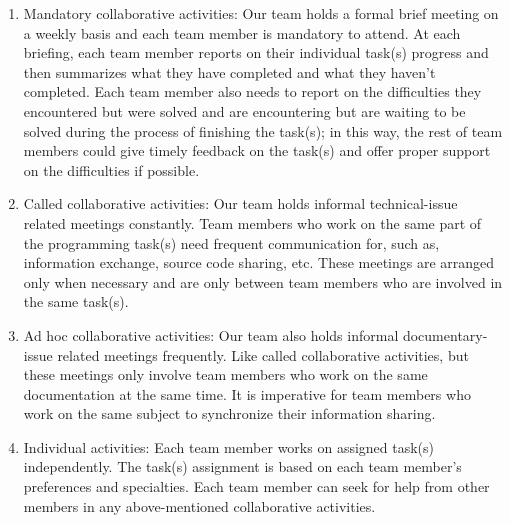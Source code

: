 \documentclass[12pt]{article}
\begin{document}
\begin{enumerate}
    \item Mandatory collaborative activities: \newline
    Our team holds a formal brief meeting on a weekly basis and each team member is mandatory to attend. At each briefing, each team member reports on their individual task(s) progress and then summarizes what they have completed and what they haven’t completed. \newline
    Each team member also needs to report on the difficulties they encountered but were solved and are encountering but are waiting to be solved during the process of finishing the task(s); in this way, the rest of team members could give timely feedback on the task(s) and offer proper support on the difficulties if possible.
    \item Called collaborative activities: \newline
    Our team holds informal technical-issue related meetings constantly. Team members who work on the same part of the programming task(s) need frequent communication for, such as, information exchange, source code sharing, etc. These meetings are arranged only when necessary and are only between team members who are involved in the same task(s).
    \item Ad hoc collaborative activities: \newline
    Our team also holds informal documentary-issue related meetings frequently. Like called collaborative activities, but these meetings only involve team members who work on the same documentation at the same time. It is imperative for team members who work on the same subject to synchronize their information sharing.
    \item Individual activities: \newline
    Each team member works on assigned task(s) independently. The task(s) assignment is based on each team member’s preferences and specialties. Each team member can seek for help from other members in any above-mentioned collaborative activities.
\end{enumerate}
\end{document}
